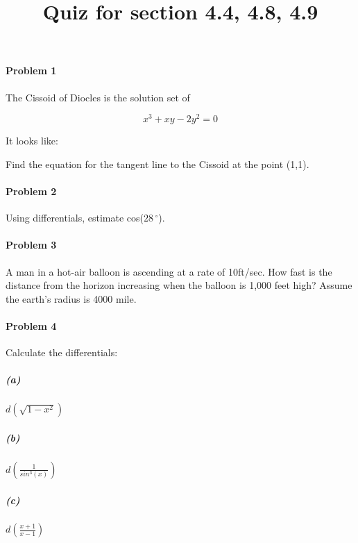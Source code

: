 \documentclass[a4paper,11pt]{article}
\title{Quiz for section 4.4, 4.8, 4.9}
\begin{document}
\maketitle
\paragraph{Problem 1}
The Cissoid of Diocles is the solution set of

\begin{equation}
x^3+xy-2y^2=0
\end{equation}

It looks like:

\begin{figure}[h]
\begin{center}
\end{center}
\end{figure}

Find the equation for the tangent line to the Cissoid at the point (1,1).
\vspace{3in}

\paragraph{Problem 2}
Using differentials, estimate cos($28\,^{\circ}$).
\vspace{1in}

\paragraph{Problem 3}
A man in a hot-air balloon is ascending at a rate of 10ft/sec.  How fast is
the distance from the horizon increasing when the balloon is 1,000 feet
high?  Assume the earth's radius is 4000 mile.
\begin{figure}[h]
\begin{flushright}
\end{flushright}
\end{figure}

\paragraph{Problem 4}
Calculate the differentials:

\subparagraph{(a)}
$d\left(\sqrt{1-x^2}\right)$
\vspace{0.4in}

\subparagraph{(b)}
$d\left(\frac{1}{sin^3(x)}\right)$
\vspace{0.4in}

\subparagraph{(c)}
$d\left(\frac{x+1}{x-1}\right)$
\vspace{0.4in}
\end{document}
